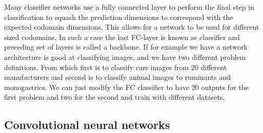 \documentclass[12pt,a4paper,english
]{tunithesis}
\begin{document}
Many classifier networks use a fully connected layer to perform the final step in classification to squash the prediction dimensions to correspond with the expected codomain dimensions. This allows for a network to be used for different sized codomains. In such a case the last FC-layer is known as classifier and preceding set of layers is called a backbone. If for example we have a network architecture is good at classifying images, and we have two different problem definitions. From which first is to classify cars images from 20 different manufacturers and second is to classify animal images to ruminants and monogastrics. We can just modify the FC classifier to have 20 outputs for the first problem and two for the second and train with different datasets.

\subsection{Convolutional neural networks}
\end{document}
